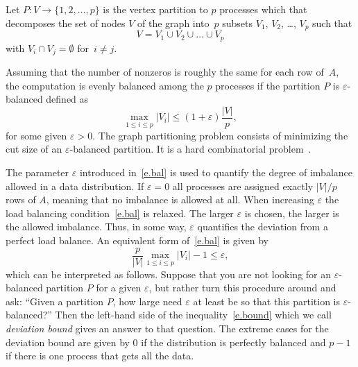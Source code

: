 \documentclass[12pt, twoside,a4paper,toc=bibliography]{scrbook}
\newcommand{\mat}[1]{\ensuremath{#1}}
\begin{document}
Let $P: V \rightarrow \{1, 2, \dots, p\}$ is the vertex partition to $p$ processes which
that decomposes the set of nodes $V$ of the graph into~$p$ subsets $V_1$, $V_2$, \dots,
$V_p$ such that
$$
V = V_1 \cup V_2 \cup \dots \cup V_p
$$
with $V_i \cap V_j = \emptyset$ for~$i \neq j$.

Assuming that the number of nonzeros is roughly the same for each row of~\mat{A}, the
computation is evenly balanced among the $p$ processes if the partition $P$ is
$\varepsilon$-balanced defined as
\begin{equation}\label{e.bal}
\max_{1 \leq i \leq p} |V_i| \leq (1 + \varepsilon) \frac{|V|}{p} ,
\end{equation}
for some given $\varepsilon > 0$. The graph partitioning problem consists of minimizing
the cut size of an $\varepsilon$-balanced partition. It is a hard combinatorial
problem~\cite{gj:com}.


The parameter $\varepsilon$ introduced in~\eqref{e.bal} is used to quantify the degree of
imbalance allowed in a data distribution. If $\varepsilon = 0$ all processes are assigned
exactly $|V|/p$ rows of \mat{A}, meaning that no imbalance is allowed at all. When
increasing $\varepsilon$ the load balancing condition~\eqref{e.bal} is relaxed. The
larger $\varepsilon$ is chosen, the larger is the allowed imbalance. Thus, in some way,
$\varepsilon$ quantifies the deviation from a perfect load balance. An equivalent form
of~\eqref{e.bal} is given by
\begin{equation}\label{e.bound}
\frac{p}{|V|} \max_{1 \leq i \leq p} |V_i| - 1 \leq \varepsilon ,
\end{equation}
which can be interpreted as follows. Suppose that you are not looking for an
$\varepsilon$-balanced partition $P$ for a given $\varepsilon$, but rather turn this
procedure around and ask: ``Given a partition $P$, how large need $\varepsilon$ at least
be so that this partition is $\varepsilon$-balanced?'' Then the left-hand side of the
inequality~\eqref{e.bound} which we call \emph{deviation bound} gives an answer to that
question. The extreme cases for the deviation bound are given by 0 if the distribution is
perfectly balanced and $p-1$ if there is one process that gets all the data. 
\end{document}
